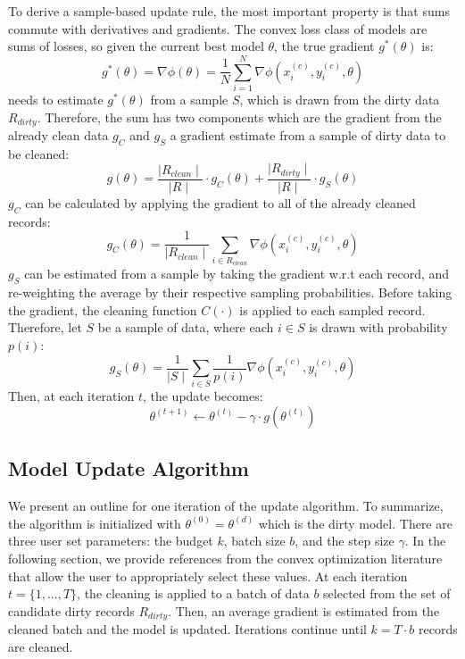 To derive a sample-based update rule, the most important property is that sums commute with derivatives and gradients.
The convex loss class of models are sums of losses, so given the current best model $\theta$, the true gradient $g^*(\theta)$ is:
\[
g^*(\theta) = \nabla\phi(\theta) = \frac{1}{N} \sum_{i=1}^N \nabla\phi(x_i^{(c)},y_i^{(c)},\theta)
\]
\sys needs to estimate $g^*(\theta)$ from a sample $S$, which is drawn from the dirty data $R_{dirty}$.
 Therefore, the sum has two components which are the gradient from the already clean data $g_C$ and $g_S$ a gradient estimate from a sample of dirty data to be cleaned:
\begin{equation}
g(\theta) = \frac{\mid R_{clean} \mid}{\mid R \mid} \cdot g_C(\theta) + \frac{\mid R_{dirty} \mid}{\mid R \mid} \cdot g_S(\theta)\label{unbia}
\end{equation}
$g_C$ can be calculated by applying the gradient to all of the already cleaned records:
\[
g_C(\theta) = \frac{1}{\mid R_{clean}\mid}\sum_{i \in R_{clean}}\nabla\phi(x_i^{(c)},y_i^{(c)},\theta)
\] 
$g_S$ can be estimated from a sample by taking the gradient w.r.t each record, and re-weighting the average by their respective sampling probabilities.
Before taking the gradient, the cleaning function $C(\cdot)$ is applied to each sampled record.
Therefore, let $S$ be a sample of data, where each $i \in S$ is drawn with probability $p(i)$:
\[
g_{S}(\theta) = \frac{1}{\mid S \mid} \sum_{i \in S}\frac{1}{p(i)}\nabla\phi(x_i^{(c)},y_i^{(c)},\theta)
\]
Then, at each iteration $t$, the update becomes:
\[
\theta^{(t+1)} \leftarrow \theta^{(t)} - \gamma \cdot g(\theta^{(t)})
\]

\subsection{Model Update Algorithm}\label{update-alg}
We present an outline for one iteration of the update algorithm.
To summarize, the algorithm is initialized with $\theta^{(0)} = \theta^{(d)}$ which is the dirty model.
There are three user set parameters: the budget $k$, batch size $b$, and the step size $\gamma$.
In the following section, we provide references from the convex optimization literature that allow the user to appropriately select these values.
At each iteration $t=\{1,...,T\}$, the cleaning is applied to a batch of data $b$ selected from the set of candidate dirty records $R_{dirty}$.
Then, an average gradient is estimated from the cleaned batch and the model is updated.
Iterations continue until $k = T \cdot b$ records are cleaned.

